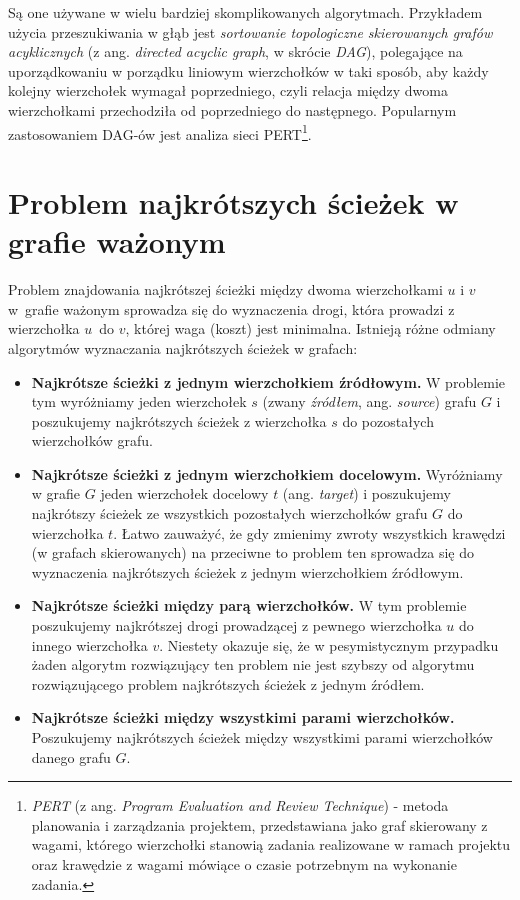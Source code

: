 \documentclass[12pt,a4paper]{book}
\theoremstyle{definition}
\numberwithin{equation}{chapter}
\begin{document}
Są one używane w wielu bardziej skomplikowanych algorytmach. Przykładem użycia przeszukiwania w głąb jest \textit{sortowanie topologiczne} \textit{skierowanych grafów acyklicznych} (z ang. \textit{directed acyclic graph}, w skrócie \textit{DAG}), polegające na uporządkowaniu w porządku liniowym wierzchołków w taki sposób, aby każdy kolejny wierzchołek wymagał poprzedniego, czyli relacja między dwoma wierzchołkami przechodziła od poprzedniego do następnego. Popularnym zastosowaniem DAG-ów jest analiza sieci PERT\footnote{\textit{PERT} (z ang. \textit{Program Evaluation and Review Technique}) - metoda planowania i zarządzania projektem, przedstawiana jako graf skierowany z wagami, którego wierzchołki stanowią zadania realizowane w ramach projektu oraz krawędzie z wagami mówiące o czasie potrzebnym na wykonanie zadania.}. 

\section{Problem najkrótszych ścieżek w grafie ważonym}

Problem znajdowania najkrótszej ścieżki między dwoma wierzchołkami $u$ i $v$ w~grafie ważonym sprowadza się do wyznaczenia drogi, która prowadzi z wierzchołka $u$~do $v$, której waga (koszt) jest minimalna. Istnieją różne odmiany algorytmów wyznaczania najkrótszych ścieżek w grafach:
\begin{itemize}
\item \textbf{Najkrótsze ścieżki z jednym wierzchołkiem źródłowym.} W problemie tym wyróżniamy jeden wierzchołek $s$ (zwany \textit{źródłem}, ang. \textit{source}) grafu $G$ i poszukujemy najkrótszych ścieżek z wierzchołka $s$ do pozostałych wierzchołków grafu.
\item \textbf{Najkrótsze ścieżki z jednym wierzchołkiem docelowym.} Wyróżniamy w grafie $G$ jeden wierzchołek docelowy $t$ (ang. \textit{target}) i poszukujemy najkrótszy ścieżek ze wszystkich pozostałych wierzchołków grafu $G$ do wierzchołka $t$. Łatwo zauważyć, że gdy zmienimy zwroty wszystkich krawędzi (w grafach skierowanych) na przeciwne to problem ten sprowadza się do wyznaczenia najkrótszych ścieżek z jednym wierzchołkiem źródłowym.
\item \textbf{Najkrótsze ścieżki między parą wierzchołków.} W tym problemie poszukujemy najkrótszej drogi prowadzącej z pewnego wierzchołka $u$ do innego wierzchołka $v$. Niestety okazuje się, że w pesymistycznym przypadku żaden algorytm rozwiązujący ten problem nie jest szybszy od algorytmu rozwiązującego problem najkrótszych ścieżek z jednym źródłem.
\item \textbf{Najkrótsze ścieżki między wszystkimi parami wierzchołków.} Poszukujemy najkrótszych ścieżek między wszystkimi parami wierzchołków danego grafu $G$.

\end{itemize}
\end{document}
